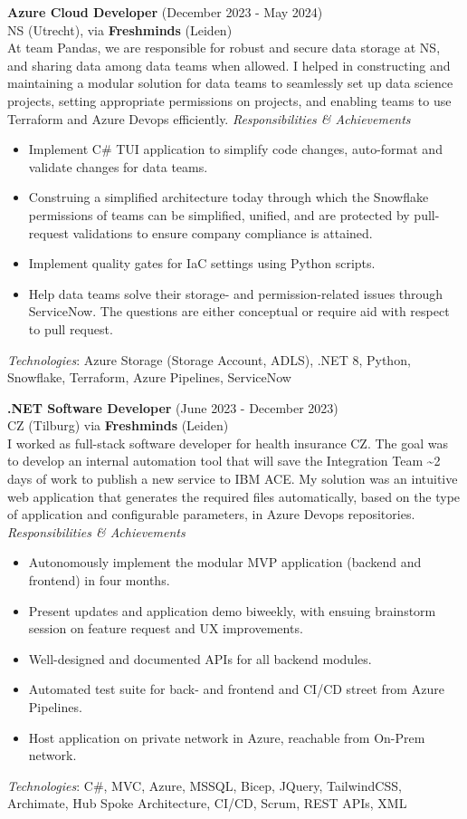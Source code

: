 \documentclass[a4paper,8pt]{article}
\begin{document}
\textbf{Azure Cloud Developer} (December 2023 - May 2024) \\
NS (Utrecht), via \textbf{Freshminds} (Leiden) \\
  At team Pandas, we are responsible for robust and secure data storage at NS,
  and sharing data among data teams when allowed. I helped in constructing and maintaining a modular solution for data teams to seamlessly set up data science projects, setting appropriate permissions on projects, and enabling teams to use Terraform and Azure Devops efficiently.
  \textit{Responsibilities \& Achievements}
  \begin{itemize}
    \item Implement C\# TUI application to simplify code changes, auto-format and validate changes for data teams.
    \item Construing a simplified architecture today through which the Snowflake permissions of teams can be simplified, unified, and are protected by pull-request validations to ensure company compliance is attained.
    \item Implement quality gates for IaC settings using Python scripts.
    \item Help data teams solve their storage- and permission-related issues through ServiceNow. The questions are either conceptual or require aid with respect to pull request.
  \end{itemize}
\textit{Technologies}: Azure Storage (Storage Account, ADLS), .NET 8, Python, Snowflake, Terraform, Azure Pipelines, ServiceNow
	
\textbf{.NET Software Developer} (June 2023 - December 2023) \\
CZ (Tilburg) via \textbf{Freshminds} (Leiden) \\
I worked as full-stack software developer for health insurance CZ. The goal was to develop an internal automation tool that will save the Integration Team \textasciitilde 2 days of work to publish a new service to IBM ACE. My solution was an intuitive web application that generates the required files automatically, based on the type of application and configurable parameters, in Azure Devops repositories. \\
\textit{Responsibilities \& Achievements}
\begin{itemize}
    \item Autonomously implement the modular MVP application (backend and frontend) in four months.
    \item Present updates and application demo biweekly, with ensuing brainstorm session on feature request and UX improvements.
    \item Well-designed and documented APIs for all backend modules.
    \item Automated test suite for back- and frontend and CI/CD street from Azure Pipelines.
    \item Host application on private network in Azure, reachable from On-Prem network.
\end{itemize}
\textit{Technologies}: C\#, MVC, Azure, MSSQL, Bicep, JQuery, TailwindCSS, Archimate, Hub Spoke Architecture, CI/CD, Scrum, REST APIs, XML
\end{document}
